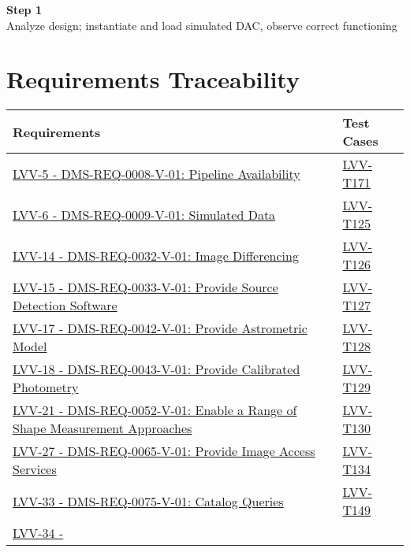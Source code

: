 \textbf{Step 1}\\
Analyze design; instantiate and load simulated DAC, observe correct
functioning\\[2\baselineskip]

\section{Requirements Traceability}\label{requirements-traceability}

\begin{longtable}[]{p{13cm}p{3cm}}
\toprule
Requirements & Test Cases\tabularnewline
\midrule
\endhead
\href{https://jira.lsstcorp.org/browse/LVV-5}{LVV-5 - DMS-REQ-0008-V-01:
Pipeline Availability} &
\protect\hyperlink{lvv-t171---verify-implementation-of-pipeline-availability}{LVV-T171}\tabularnewline
\href{https://jira.lsstcorp.org/browse/LVV-6}{LVV-6 - DMS-REQ-0009-V-01:
Simulated Data} &
\protect\hyperlink{lvv-t125---verify-implementation-of-simulated-data}{LVV-T125}\tabularnewline
\href{https://jira.lsstcorp.org/browse/LVV-14}{LVV-14 -
DMS-REQ-0032-V-01: Image Differencing} &
\protect\hyperlink{lvv-t126---verify-implementation--image-differencing}{LVV-T126}\tabularnewline
\href{https://jira.lsstcorp.org/browse/LVV-15}{LVV-15 -
DMS-REQ-0033-V-01: Provide Source Detection Software} &
\protect\hyperlink{lvv-t127---verify-implementation-of-provide-source-detection-software}{LVV-T127}\tabularnewline
\href{https://jira.lsstcorp.org/browse/LVV-17}{LVV-17 -
DMS-REQ-0042-V-01: Provide Astrometric Model} &
\protect\hyperlink{lvv-t128---verify-implementation-provide-astrometric-model}{LVV-T128}\tabularnewline
\href{https://jira.lsstcorp.org/browse/LVV-18}{LVV-18 -
DMS-REQ-0043-V-01: Provide Calibrated Photometry} &
\protect\hyperlink{lvv-t129---verify-implementation-of-provide-calibrated-photometry}{LVV-T129}\tabularnewline
\href{https://jira.lsstcorp.org/browse/LVV-21}{LVV-21 -
DMS-REQ-0052-V-01: Enable a Range of Shape Measurement Approaches} &
\protect\hyperlink{lvv-t130---verify-implementation-of-enable-a-range-of-shape-measurement-approaches}{LVV-T130}\tabularnewline
\href{https://jira.lsstcorp.org/browse/LVV-27}{LVV-27 -
DMS-REQ-0065-V-01: Provide Image Access Services} &
\protect\hyperlink{lvv-t134---verify-implementation-of-provide-image-access-services}{LVV-T134}\tabularnewline
\href{https://jira.lsstcorp.org/browse/LVV-33}{LVV-33 -
DMS-REQ-0075-V-01: Catalog Queries} &
\protect\hyperlink{lvv-t149---verify-implementation-of-catalog-queries}{LVV-T149}\tabularnewline
\href{https://jira.lsstcorp.org/browse/LVV-34}{LVV-34 -
}
\end{longtable}
